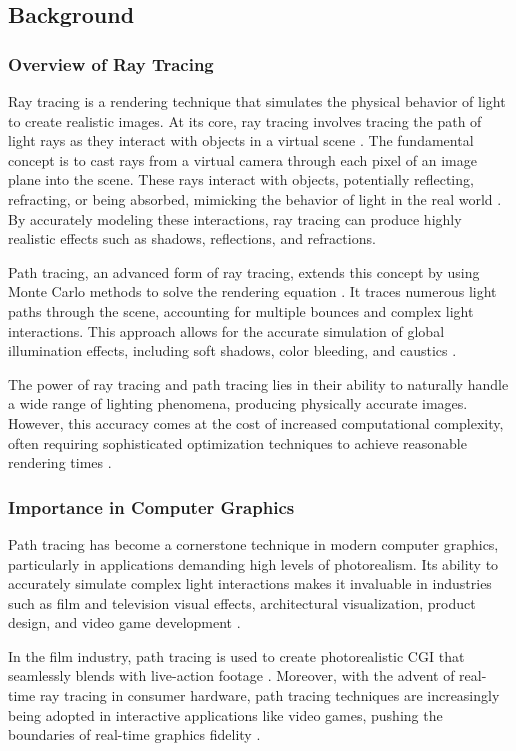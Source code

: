 \documentclass[12pt]{article}
\begin{document}
\subsection{Background}
\subsubsection{Overview of Ray Tracing}
Ray tracing is a rendering technique that simulates the physical behavior of light to create realistic images. At its core, ray tracing involves tracing the path of light rays as they interact with objects in a virtual scene \cite{Glassner1989}.
The fundamental concept is to cast rays from a virtual camera through each pixel of an image plane into the scene. These rays interact with objects, potentially reflecting, refracting, or being absorbed, mimicking the behavior of light in the real world \cite{Whitted1980}. By accurately modeling these interactions, ray tracing can produce highly realistic effects such as shadows, reflections, and refractions.

Path tracing, an advanced form of ray tracing, extends this concept by using Monte Carlo methods to solve the rendering equation \cite{Kajiya1986}. It traces numerous light paths through the scene, accounting for multiple bounces and complex light interactions. This approach allows for the accurate simulation of global illumination effects, including soft shadows, color bleeding, and caustics \cite{Veach1997}.

The power of ray tracing and path tracing lies in their ability to naturally handle a wide range of lighting phenomena, producing physically accurate images. However, this accuracy comes at the cost of increased computational complexity, often requiring sophisticated optimization techniques to achieve reasonable rendering times \cite{Pharr2016}.
\subsubsection{Importance in Computer Graphics}
Path tracing has become a cornerstone technique in modern computer graphics, particularly in applications demanding high levels of photorealism. Its ability to accurately simulate complex light interactions makes it invaluable in industries such as film and television visual effects, architectural visualization, product design, and video game development \cite{Keller2015}.

In the film industry, path tracing is used to create photorealistic CGI that seamlessly blends with live-action footage \cite{Christensen2018}. Moreover, with the advent of real-time ray tracing in consumer hardware, path tracing techniques are increasingly being adopted in interactive applications like video games, pushing the boundaries of real-time graphics fidelity \cite{Schied2017}.
\end{document}
